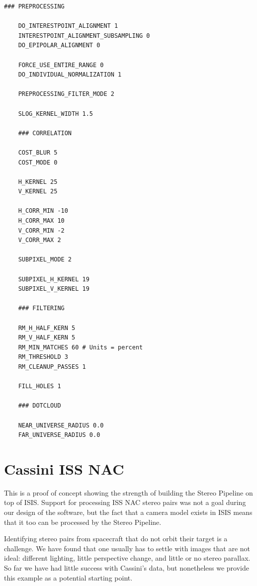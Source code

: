 \begin{center}\begin{minipage}{5.5in}
\begin{Verbatim}[frame=single,fontsize=\small,label=stereo.default for MDIS]
    ### PREPROCESSING

    DO_INTERESTPOINT_ALIGNMENT 1
    INTERESTPOINT_ALIGNMENT_SUBSAMPLING 0
    DO_EPIPOLAR_ALIGNMENT 0

    FORCE_USE_ENTIRE_RANGE 0
    DO_INDIVIDUAL_NORMALIZATION 1

    PREPROCESSING_FILTER_MODE 2

    SLOG_KERNEL_WIDTH 1.5

    ### CORRELATION

    COST_BLUR 5
    COST_MODE 0

    H_KERNEL 25
    V_KERNEL 25

    H_CORR_MIN -10
    H_CORR_MAX 10
    V_CORR_MIN -2
    V_CORR_MAX 2

    SUBPIXEL_MODE 2

    SUBPIXEL_H_KERNEL 19
    SUBPIXEL_V_KERNEL 19

    ### FILTERING

    RM_H_HALF_KERN 5
    RM_V_HALF_KERN 5
    RM_MIN_MATCHES 60 # Units = percent
    RM_THRESHOLD 3
    RM_CLEANUP_PASSES 1

    FILL_HOLES 1

    ### DOTCLOUD

    NEAR_UNIVERSE_RADIUS 0.0
    FAR_UNIVERSE_RADIUS 0.0
\end{Verbatim}
\end{minipage}\end{center}

\clearpage

\section{Cassini ISS NAC}

This is a proof of concept showing the strength of building the Stereo
Pipeline on top of \ac{ISIS}.  Support for processing ISS NAC stereo pairs
was not a goal during our design of the software, but the fact that a
camera model exists in \ac{ISIS} means that it too can be processed by the
Stereo Pipeline.

Identifying stereo pairs from spacecraft that do not orbit their
target is a challenge. We have found that one usually has to settle
with images that are not ideal: different lighting, little perspective
change, and little or no stereo parallax. So far we have had little
success with Cassini's data, but nonetheless we provide this example
as a potential starting point.

